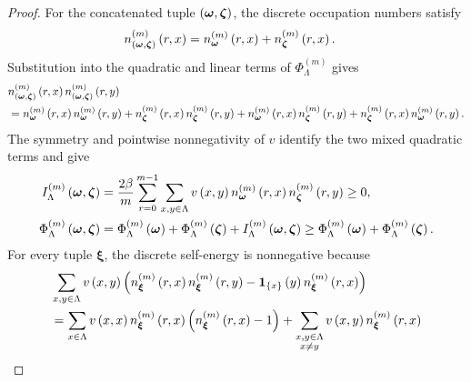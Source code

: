 \documentclass[11pt,a4paper]{article}
\theoremstyle{plain}
\theoremstyle{definition}
\theoremstyle{remark}
\begin{document}
\begin{proof}
For the concatenated tuple $\rbk{\boldsymbol{\omega},\boldsymbol{\zeta}}$, the discrete occupation numbers
satisfy
$$\begin{aligned}
\fun{n_{\rbk{\boldsymbol{\omega},\boldsymbol{\zeta}}}^{(m)}}{r,x}
& =
\fun{n_{\boldsymbol{\omega}}^{(m)}}{r,x}
+
\fun{n_{\boldsymbol{\zeta}}^{(m)}}{r,x}.
\end{aligned}$$
Substitution into the quadratic and linear terms of $\Phi_{\Lambda}^{(m)}$ gives
$$\begin{aligned}
&
\fun{n_{\rbk{\boldsymbol{\omega},\boldsymbol{\zeta}}}^{(m)}}{r,x}
\fun{n_{\rbk{\boldsymbol{\omega},\boldsymbol{\zeta}}}^{(m)}}{r,y}
\\ %
& =
\fun{n_{\boldsymbol{\omega}}^{(m)}}{r,x}
\fun{n_{\boldsymbol{\omega}}^{(m)}}{r,y}
+
\fun{n_{\boldsymbol{\zeta}}^{(m)}}{r,x}
\fun{n_{\boldsymbol{\zeta}}^{(m)}}{r,y}
+
\fun{n_{\boldsymbol{\omega}}^{(m)}}{r,x}
\fun{n_{\boldsymbol{\zeta}}^{(m)}}{r,y}
+
\fun{n_{\boldsymbol{\zeta}}^{(m)}}{r,x}
\fun{n_{\boldsymbol{\omega}}^{(m)}}{r,y}.
\end{aligned}$$
The symmetry and pointwise nonnegativity of $v$ identify the two mixed quadratic terms and give
$$\begin{aligned}
\fun{I_{\Lambda}^{(m)}}{\boldsymbol{\omega},\boldsymbol{\zeta}}
& =
\frac{2\sminvtemperature}{m}
\sum_{r = 0}^{m - 1}
\sum_{x,y \in \Lambda}
\fun{v}{x,y}
\fun{n_{\boldsymbol{\omega}}^{(m)}}{r,x}
\fun{n_{\boldsymbol{\zeta}}^{(m)}}{r,y}
\geq
0,
\\
\fun{\Phi_{\Lambda}^{(m)}}{\boldsymbol{\omega},\boldsymbol{\zeta}}
& =
\fun{\Phi_{\Lambda}^{(m)}}{\boldsymbol{\omega}}
+
\fun{\Phi_{\Lambda}^{(m)}}{\boldsymbol{\zeta}}
+
\fun{I_{\Lambda}^{(m)}}{\boldsymbol{\omega},\boldsymbol{\zeta}}
\geq
\fun{\Phi_{\Lambda}^{(m)}}{\boldsymbol{\omega}}
+
\fun{\Phi_{\Lambda}^{(m)}}{\boldsymbol{\zeta}}.
\end{aligned}$$
For every tuple $\boldsymbol{\xi}$, the discrete self-energy is nonnegative because
$$\begin{aligned}
&
\sum_{x,y \in \Lambda}
\fun{v}{x,y}
\rbk{
\fun{n_{\boldsymbol{\xi}}^{(m)}}{r,x}
\fun{n_{\boldsymbol{\xi}}^{(m)}}{r,y}
-
\fun{\fndef{\setone{x}}}{y}
\fun{n_{\boldsymbol{\xi}}^{(m)}}{r,x}}
\\
& =
\sum_{x \in \Lambda}
\fun{v}{x,x}
\fun{n_{\boldsymbol{\xi}}^{(m)}}{r,x}
\rbk{\fun{n_{\boldsymbol{\xi}}^{(m)}}{r,x}-1}
+
\sum_{\substack{x,y \in \Lambda\\x\neq y}}
\fun{v}{x,y}
\fun{n_{\boldsymbol{\xi}}^{(m)}}{r,x}

\end{aligned}$$
\end{proof}
\end{document}
